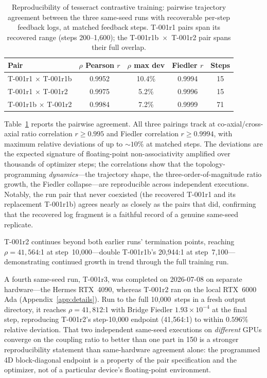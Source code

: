 \begin{table}[H]
\centering
\caption{Reproducibility of tesseract contrastive training: pairwise
  trajectory agreement between the three same-seed runs with
  recoverable per-step feedback logs, at matched
  feedback steps. T-001r1 pairs span its recovered range
  (steps 200--1{,}600); the T-001r1b~$\times$~T-001r2 pair spans
  their full overlap.}
\label{tab:reproducibility}
\small
\begin{tabular}{lcccc}
\toprule
Pair & $\rho$ Pearson $r$ & $\rho$ max dev & Fiedler $r$ & Steps \\
\midrule
T-001r1 $\times$ T-001r1b & 0.9952 & 10.4\% & 0.9994 & 15 \\
T-001r1 $\times$ T-001r2  & 0.9975 & 5.2\%  & 0.9996 & 15 \\
T-001r1b $\times$ T-001r2 & 0.9984 & 7.2\%  & 0.9999 & 71 \\
\bottomrule
\end{tabular}
\end{table}

Table~\ref{tab:reproducibility} reports the pairwise agreement. All
three pairings track at co-axial/cross-axial ratio correlation
$r \geq 0.995$ and Fiedler correlation $r \geq 0.9994$, with maximum
relative deviations of up to ${\sim}10\%$ at matched steps. The
deviations are the expected signature of floating-point
non-associativity amplified over thousands of optimizer steps; the
correlations show that the topology-programming
\emph{dynamics}---the trajectory shape, the three-order-of-magnitude
ratio growth, the Fiedler collapse---are reproducible across
independent executions. Notably, the run pair that never coexisted
(the recovered T-001r1 and its replacement T-001r1b) agrees nearly as
closely as the pairs that did, confirming that the recovered log
fragment is a faithful record of a genuine same-seed replicate.

T-001r2 continues beyond both earlier runs' termination points,
reaching $\rho = 41{,}564$:1 at step~10{,}000---double T-001r1b's
20{,}944:1 at step~7{,}100---demonstrating continued growth in trend
through the full training run.

A fourth same-seed run, T-001r3, was completed on 2026-07-08 on
separate hardware---the Hermes RTX~4090, whereas T-001r2 ran on the
local RTX~6000 Ada (Appendix~\ref{app:details}). Run to the full
10{,}000~steps in a fresh output directory, it reaches
$\rho = 41{,}812$:1 with Bridge Fiedler $1.93 \times 10^{-4}$ at the
final step, reproducing T-001r2's step-10{,}000 endpoint
(41{,}564:1) to within $0.596\%$ relative deviation. That two
independent same-seed executions on \emph{different} GPUs converge on
the coupling ratio to better than one part in 150 is a stronger
reproducibility statement than same-hardware agreement alone: the
programmed 4D block-diagonal endpoint is a property of the pair
specification and the optimizer, not of a particular device's
floating-point environment.


